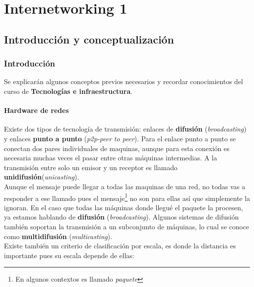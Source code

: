 \documentclass[
	12pt, %
	fleqn, %
	a4paper, %
]{LegrandOrangeBook}
\begin{document}
\part{Internetworking 1}
\chapter{Introducción y conceptualización}
\section{Introducción}
Se explicarán algunos conceptos previos necesarios y recordar conocimientos del curso de \textbf{Tecnologías e infraestructura}.
\subsection{Hardware de redes}
Existe dos tipos de tecnología de transmisión: enlaces de \textbf{difusión} (\textit{broadcasting}) y enlaces \textbf{punto a punto} (\textit{p2p-peer to peer}). Para el enlace punto a punto se conectan dos pares individuales de maquinas, aunque para esta conexión es necesaria muchas veces el pasar entre otras máquinas intermedias. A la transmisión entre solo un emisor y un receptor es llamado \textbf{unidifusión}(\textit{unicasting}).\\
Aunque el mensaje puede llegar a todas las maquinas de una red, no todas vas a responder a ese llamado pues el mensaje\footnote{En algunos contextos es llamado \textit{paquete}} no son para ellas así que simplemente la ignoran. En el caso que todas las máquinas donde llegué el paquete la procesen, ya estamos hablando de \textbf{difusión} (\textit{broadcasting}). Algunos sistemas de difusión también soportan la transmisión a
un subconjunto de máquinas, lo cual se conoce como \textbf{multidifusión} (\textit{multicasting}).\\
Existe también un criterio de clasificación por escala, es donde la distancia es importante pues su escala depende de ellas:
\end{document}
